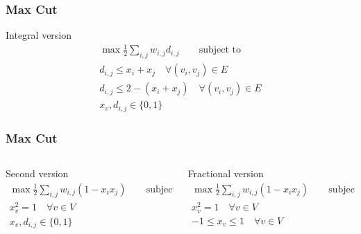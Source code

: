 \documentclass[12pt,aspectratio=169]{beamer}
\begin{document}
 

\begin{frame}\frametitle{Max Cut}
  \begin{block}{Integral version}
  \begin{equation}
    \begin{split}
      \max \frac{1}{2}\sum_{i,j} w_{i,j}d_{i,j}\qquad\text{subject to}\\
      d_{i,j} \le x_{i} + x_{j} \quad \forall (v_{i}, v_{j})\in E\\
      d_{i,j} \le 2 - \left(x_{i} + x_{j}\right) \quad \forall (v_{i}, v_{j})\in E\\
      x_{v}, d_{i,j}\in \{0,1\}
     \end{split}
   \end{equation}
 \end{block}
\end{frame}

\begin{frame}\frametitle{Max Cut}
\begin{columns} 
  \begin{column}{0.48\textwidth}
  \begin{block}{Second version}
  \begin{equation}
    \begin{split}
      \max \frac{1}{2}\sum_{i,j} w_{i,j}(1 - x_{i}x_{j})\qquad\text{subject to}\\
      x_{v}^{2} =1\quad \forall v\in V\\
      x_{v}, d_{i,j}\in \{0,1\}
     \end{split}
   \end{equation}
 \end{block}
\end{column}
  \begin{column}{0.48\textwidth}
\begin{block}{Fractional version}
  \begin{equation}
    \begin{split}
      \max \frac{1}{2}\sum_{i,j} w_{i,j}(1 - x_{i}x_{j})\qquad\text{subject to}\\
      x_{v}^{2} =1\quad \forall v\in V\\
      -1\le x_{v}\le  1\quad \forall v\in V
     \end{split}
   \end{equation}
 \end{block}
\end{column}
\end{columns}
\end{frame}
\end{document}
